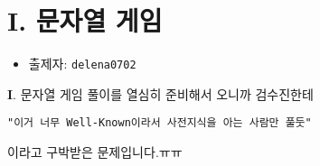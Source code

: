 \section{I. 문자열 게임}

\begin{frame} %
    \begin{itemize}
        \item 출제자: \texttt{delena0702}
    \end{itemize}
\end{frame}

\begin{frame}{\textbf{I}. 문자열 게임}
    풀이를 열심히 준비해서 오니까 검수진한테
    
    \vspace{18pt}
    
    \texttt{"이거 너무 Well-Known이라서 사전지식을 아는 사람만 풀둣"}
    
    \vspace{18pt}
    
    이라고 구박받은 문제입니다.ㅠㅠ
\end{frame}